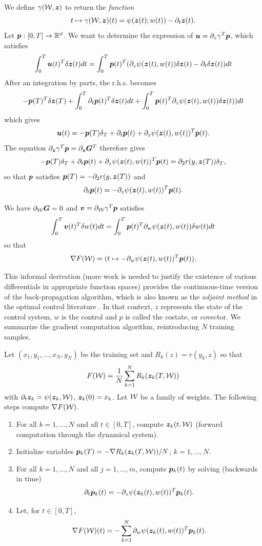 We define 
$\gamma({\mathcal W}, {\bm{z}})$ to return the {\em function}
\[
t \mapsto \gamma({\mathcal W}, {\bm{z}})(t) = \psi({\bm{z}}(t); w(t)) - \partial_t {\bm{z}}(t).
\]
Let ${\bm{p}}: [0,T] \to {\mathbb{R}}^d$. We want to determine the expression of $\bm u = \partial_z \gamma^T {\bm{p}}$, which satisfies 
\[
\int_0^T {\bm{u}}(t)^T \delta {\bm{z}}(t) dt = \int_0^T {\bm{p}}(t)^T (\partial_z \psi({\bm{z}}(t), w(t))\delta{\bm{z}}(t) -\partial_t \delta {\bm{z}}(t))  dt
\]
After an integration by parts, the r.h.s. becomes 
\[
-{\bm{p}}(T)^T \delta {\bm{z}}(T) + \int_0^T \partial_t {\bm{p}}(t)^T \delta{\bm{z}}(t) dt + \int_0^T {\bm{p}}(t)^T \partial_z \psi({\bm{z}}(t), w(t)) \delta{\bm{z}}(t)) dt
\]
which gives
\[
{\bm{u}}(t) = - {\bm{p}}(T) \delta_T + \partial_t {\bm{p}}(t) + \partial_z \psi({\bm{z}}(t), w(t))^T {\bm{p}}(t).
\]
The equation $\partial_{\bm z} \gamma^T \bm p = \partial_{\bm z} \bm G^T$
therefore gives
\[
-{\bm{p}}(T) \delta_T + \partial_t {\bm{p}}(t) + \partial_z \psi({\bm{z}}(t), w(t))^T {\bm{p}}(t) = \partial_2 r(y, {\bm{z}}(T)) \delta_T,
\]
so that ${\bm{p}}$ satisfies ${\bm{p}}(T) = -\partial_2 r(y, {\bm{z}}(T))$ and 
\begin{equation}
\label{eq:adjoint.p}
\partial_t {\bm{p}}(t) = - \partial_z \psi({\bm{z}}(t), w(t))^T {\bm{p}}(t).
\end{equation}

We have $\partial_{{\mathcal W}} \bm G = 0$ and ${\bm{v}} = \partial_{{\mathcal W}} \gamma^T {\bm{p}}$ satisfies
\[
\int_0^T {\bm{v}}(t)^T \delta w(t) dt = \int_0^T {\bm{p}}(t)^T \partial_w \psi({\bm{z}}(t), w(t)) \delta w(t) dt
\]
so that
\[
\nabla F({\mathcal W}) = (t \mapsto - \partial_w \psi({\bm{z}}(t), w(t))^T {\bm{p}}(t)).
\]

This informal derivation (more work is needed to justify the existence of various differentials in appropriate function spaces) provides the continuous-time version of the back-propagation algorithm, which is also known as the {\em adjoint method} in the optimal control literature \citep{hocking1991optimal,macki2012introduction}. In that context, $z$ represents the state of the control system, $w$ is the control and $p$ is called the costate, or covector. We summarize the gradient computation algorithm, reintroducing $N$ training samples.
\begin{algorithm}
\label{alg:adjoint} 
Let $(x_1, y_1, \ldots, x_N, y_N)$ be the training set and $R_k(z) = r(y_k, z)$ so that 
\[
F({\mathcal W}) = \frac1N \sum_{k=1}^N R_k({\bm{z}}_{k}(T, {\mathcal W}))
\]
 with $\partial_t {\bm{z}}_{k} = \psi({\bm{z}}_k, {\mathcal W})$, ${\bm{z}}_k(0) = x_k$.
 Let ${\mathcal W}$ be a family of weights. The following steps compute $\nabla F({\mathcal W})$.
\begin{enumerate}[label=\arabic*., wide = 0.5cm]
\item For all $k=1, \ldots, N$ and all $t\in[0,T]$, compute ${\bm{z}}_{k}(t, {\mathcal W})$ (forward computation through the dynamical system).
\item Initialize variables ${\bm{p}}_{k}(T) = -\nabla R_k({\bm{z}}_{k}(T, {\mathcal W}))/N$, $k=1, \ldots, N$.
\item For all $k=1, \ldots, N$ and all $j=1, \ldots, m$, compute ${\bm{p}}_{k}(t)$ by solving (backwards in time)
\[
\partial_t {\bm{p}}_k(t) = - \partial_z \psi({\bm{z}}_k(t), w(t))^T {\bm{p}}_k(t).
\]
\item Let, for $t\in [0,T]$,
\[
\nabla F({\mathcal W})(t) = -\sum_{k=1}^N \partial_w \psi({\bm{z}}_k(t), w(t))^T {\bm{p}}_k(t).
\]
\end{enumerate}
\end{algorithm}


